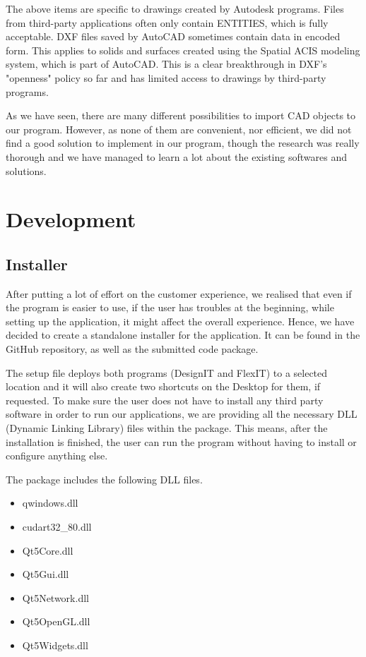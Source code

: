 \documentclass[a4paper, 11pt, article]{report}
\begin{document}
The above items are specific to drawings created by Autodesk programs. Files from third-party applications often only contain ENTITIES, which is fully acceptable.
DXF files saved by AutoCAD sometimes contain data in encoded form. This applies to solids and surfaces created using the Spatial ACIS modeling system, which is part of AutoCAD. This is a clear breakthrough in DXF's "openness" policy so far and has limited access to drawings by third-party programs.

As we have seen, there are many different possibilities to import CAD objects to our program. However, as none of them are convenient, nor efficient, we did not find a good solution to implement in our program, though the research was really thorough and we have managed to learn a lot about the existing softwares and solutions.
   

\chapter{Development}

\section{Installer}

After putting a lot of effort on the customer experience, we realised that even if the program is easier to use, if the user has troubles at the beginning, while setting up the application, it might affect the overall experience. Hence, we have decided to create a standalone installer for the application. It can be found in the GitHub repository, as well as the submitted code package.

The setup file deploys both programs (DesignIT and FlexIT) to a selected location and it will also create two shortcuts on the Desktop for them, if requested. To make sure the user does not have to install any third party software in order to run our applications, we are providing all the necessary DLL (Dynamic Linking Library) files within the package. This means, after the installation is finished, the user can run the program without having to install or configure anything else.

The package includes the following DLL files.

\begin{itemize}
\item qwindows.dll
\item cudart32\_80.dll
\item Qt5Core.dll
\item Qt5Gui.dll
\item Qt5Network.dll
\item Qt5OpenGL.dll
\item Qt5Widgets.dll
\end{itemize}
\end{document}
